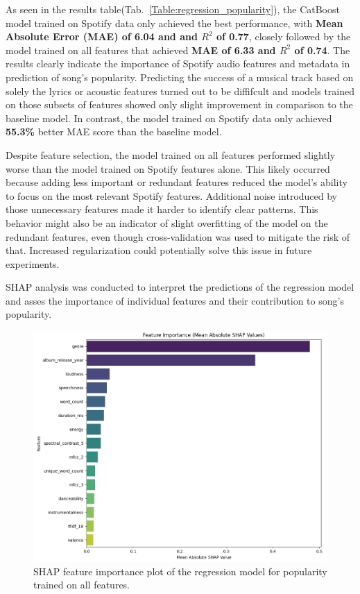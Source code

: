 As seen in the results table(Tab.~\ref{Table:regression_popularity}), the
CatBoost model trained on Spotify data only achieved the best performance, with
\textbf{Mean Absolute Error (MAE) of \textbf{6.04} and and $R^2$ of 0.77},
closely followed by the model trained on all features that achieved \textbf{MAE
of 6.33 and $R^2$ of 0.74}. The results clearly indicate the importance of
Spotify audio features and metadata in prediction of song's popularity.
Predicting the success  of a musical track based on solely the lyrics or
acoustic features turned out to be diffifcult and models trained on those
subsets of features showed only slight improvement in comparison to the
baseline model. In contrast, the model trained on Spotify data only achieved
\textbf{55.3\%} better MAE score than the baseline model.

Despite feature selection, the model trained on all features performed slightly
worse than the model trained on Spotify features alone. This likely occurred
because adding less important or redundant features reduced the model's ability
to focus on the most relevant Spotify features. Additional noise introduced by
those unnecessary features made it harder to identify clear patterns. This
behavior might also be an indicator of slight overfitting of the model on the
redundant features, even though cross-validation was used to mitigate the risk
of that. Increased regularization could potentially solve this issue in
future experiments.


SHAP analysis was conducted to interpret the predictions of the regression
model and asses the importance of individual features and their contribution to
song's popularity.


\begin{center}
\begin{figure}[H]
  \centering
  \includegraphics[width=6in]{img/feature_importance_popularity_reg.png}
  \caption{SHAP feature importance plot of the regression model for popularity trained on all features.}
  \label{Figure:feature_importance_popularity_reg}
\end{figure}
\end{center}


